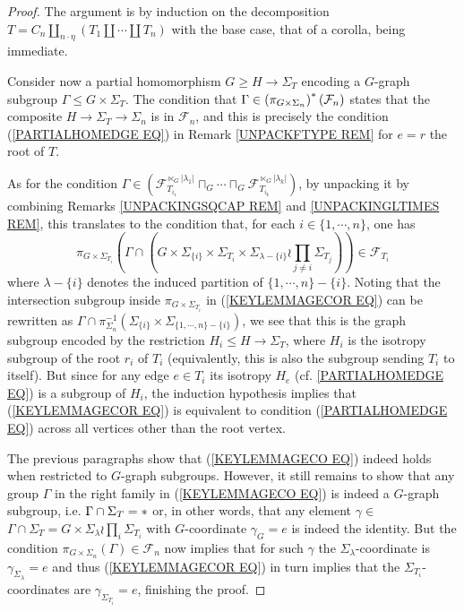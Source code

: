 \documentclass[a4paper,10pt]{article}%
\begin{document}
\begin{proof} The argument is by induction on the decomposition
$T= C_n \amalg_{n \cdot \eta}(T_1 \amalg \cdots \amalg T_n)$
with the base case, that of a corolla, being immediate.

	Consider now a partial homomorphism $G \geq H \to \Sigma_T$ encoding a 
	$G$-graph subgroup $\Gamma \leq G \times \Sigma_T$.
	The condition that $\Gamma \in \left(\pi_{G \times \Sigma_n}\right)^{\**}(\mathcal{F}_n)$ states that the composite $H \to \Sigma_T \to \Sigma_n$ is in $\mathcal{F}_n$, 
	and this is precisely the condition (\ref{PARTIALHOMEDGE EQ}) in Remark \ref{UNPACKFTYPE REM}
	for $e=r$ the root of $T$.

As for the condition 
	$ \Gamma \in 
	\left(
	\mathcal{F}_{T_{i_1}}^{\ltimes_G |\lambda_1|}
		\sqcap_G \cdots \sqcap_G
	\mathcal{F}_{T_{i_k}}^{\ltimes_G |\lambda_k|}
	\right)	$, by unpacking it by combining 
	Remarks \ref{UNPACKINGSQCAP REM} and 
	\ref{UNPACKINGLTIMES REM},
	this translates to the condition that, for each $i \in \{1,\cdots,n\}$, one has
	\begin{equation}\label{KEYLEMMAGECOR EQ}
	\pi_{G \times \Sigma_{T_i}}
	\left(
		\Gamma \cap 
	\left(
		G \times \Sigma_{\{i\}} \times \Sigma_{T_i}
		\times 
		\Sigma_{\lambda-\{i\}} \wr \prod_{j\neq i} \Sigma_{T_j}
	\right)
	\right)	
	\in \mathcal{F}_{T_i}
	\end{equation}
where $\lambda - \{i\}$ denotes the induced partition of 
$\{1,\cdots,n\} - \{i\}$. Noting that the intersection subgroup  inside $\pi_{G \times \Sigma_{T_i}}$ in (\ref{KEYLEMMAGECOR EQ}) can be rewritten as 
$\Gamma \cap \pi_{\Sigma_n}^{-1}
(\Sigma_{\{i\}} \times \Sigma_{\{1,\cdots,n\} - \{i\}})$,
we see that this is the graph subgroup encoded by the restriction $H_i \leq H \to \Sigma_T$, where $H_i$ is the isotropy subgroup of the root $r_i$ of $T_i$ (equivalently, this is also the subgroup sending $T_i$ to itself).
But since for any edge $e \in T_i$ its isotropy $H_e$ 
(cf. \ref{PARTIALHOMEDGE EQ}) is a subgroup of $H_i$, the induction hypothesis implies that (\ref{KEYLEMMAGECOR EQ})
is equivalent to condition (\ref{PARTIALHOMEDGE EQ}) 
across all vertices other than the root vertex.

The previous paragraphs show that 
(\ref{KEYLEMMAGECO EQ})
indeed holds when restricted to $G$-graph subgroups. However, it still remains to show that any group $\Gamma$ in the right family in (\ref{KEYLEMMAGECO EQ}) is indeed
a $G$-graph subgroup, i.e. $\Gamma \cap \Sigma_T =\**$ or,
in other words, that any element 
$\gamma \in $%
$\Gamma \cap \Sigma_T =
G \times \Sigma_{\lambda} \wr \prod_{i} \Sigma_{T_i}$
with $G$-coordinate 
$\gamma_G = e$ is indeed the identity.
But the condition 
$\pi_{G \times \Sigma_n}(\Gamma) \in \mathcal{F}_n$ now implies that for such $\gamma$ the $\Sigma_{\lambda}$-coordinate is $\gamma_{\Sigma_{\lambda}} = e$
and thus (\ref{KEYLEMMAGECOR EQ}) in turn implies that the 
$\Sigma_{T_i}$-coordinates are 
$\gamma_{\Sigma_{T_i}} = e$,
finishing the proof.
\end{proof}
\end{document}
